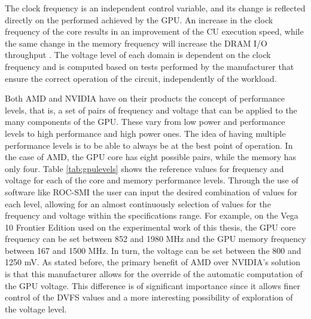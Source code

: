 The clock frequency is an independent control variable, and its change is reflected directly on the performed achieved by the GPU. An increase in the clock frequency of the core results in an improvement of the CU execution speed, while the same change in the memory frequency will increase the DRAM I/O throughput \cite{mei_survey_2016}. The voltage level of each domain is dependent on the clock frequency and is computed based on tests performed by the manufacturer that ensure the correct operation of the circuit, independently of the workload.

Both AMD and NVIDIA have on their products the concept of performance levels, that is, a set of pairs of frequency and voltage that can be applied to the many components of the GPU. These vary from low power and performance levels to high performance and high power ones. The idea of having multiple performance levels is to be able to always be at the best point of operation.  In the case of AMD, the GPU core has eight possible pairs, while the memory has only four. Table \ref{tab:gpulevels} shows the reference values for frequency and voltage for each of the core and memory performance levels. Through the use of software like ROC-SMI \cite{noauthor_radeonopencompute/roc-smi_2019} the user can input the desired combination of values for each level, allowing for an almost continuously selection of values for the frequency and voltage within the specifications range. For example, on the Vega 10 Frontier Edition used on the experimental work of this thesis, the GPU core frequency can be set between 852 and 1980 MHz and the GPU memory frequency between 167 and 1500 MHz. In turn, the voltage can be set between the 800 and 1250 mV. As stated before, the primary benefit of AMD over NVIDIA's solution is that this manufacturer allows for the override of the automatic computation of the GPU voltage. This difference is of significant importance since it allows finer control of the DVFS values and a more interesting possibility of exploration of the voltage level.


